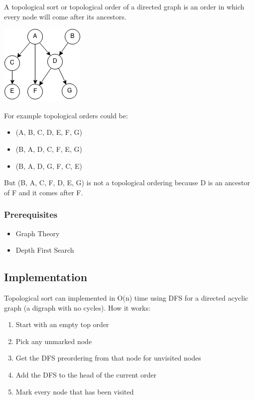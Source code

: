 \documentclass[11pt,oneside]{book}
\makeatletter
\def\maxwidth#1{\ifdim\Gin@nat@width>#1 #1\else\Gin@nat@width\fi}
\makeatother
\begin{document}
A topological sort or topological order of a directed graph is an order in which every node will come after its ancestors.

\includegraphics[width=\maxwidth{\textwidth}]{topsort.png}

For example topological orders could be:

\begin{itemize}
\item (A, B, C, D, E, F, G)
\item (B, A, D, C, F, E, G)
\item (B, A, D, G, F, C, E)
\end{itemize}

But (B, A, C, F, D, E, G) is not a topological ordering because D is an ancestor of F and it comes after F.

\subsubsection{Prerequisites}

\begin{itemize}
\item Graph Theory
\item Depth First Search
\end{itemize}

\subsection{Implementation}

Topological sort can implemented in O(n) time using DFS for a directed acyclic graph (a digraph with no cycles). How it works:

\begin{enumerate}
\item Start with an empty top order
\item Pick any unmarked node
\item Get the DFS preordering from that node for unvisited nodes 
\item Add the DFS to the head of the current order
\item Mark every node that has been visited
\end{enumerate}
\end{document}
